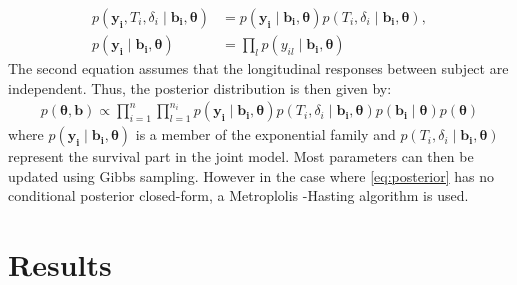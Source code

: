 \documentclass[11pt,twoside]{article}
\numberwithin{Theorem}{section}
\numberwithin{Definition}{section}
\numberwithin{Lemma}{section}
\numberwithin{Algorithm}{section}
\numberwithin{equation}{section}
\begin{document}
 \begin{align}
     p(\boldsymbol{y_i},T_i,\delta_i \mid \boldsymbol{b_i},\boldsymbol{\theta})&=p(\boldsymbol{y_i}\mid\boldsymbol{b_i},\boldsymbol{\theta})p(T_i,\delta_i\mid\boldsymbol{b_i},\boldsymbol{\theta}),
     \\
     p(\boldsymbol{y_i}\mid\boldsymbol{b_i},\boldsymbol{\theta})&=\prod_l p(y_{il} \mid \boldsymbol{b_i},\boldsymbol{\theta})
 \end{align}
 The second equation assumes that the longitudinal responses between subject are independent. Thus, the posterior distribution is then given by:
 \begin{align}
 \label{eq:posterior}
     p(\boldsymbol{\theta},\boldsymbol{b}) \propto \prod_{i=1}^{n} \prod_{l=1}^{n_i}p(\boldsymbol{y_i}\mid\boldsymbol{b_i},\boldsymbol{\theta})p(T_i,\delta_i\mid\boldsymbol{b_i},\boldsymbol{\theta})p(\boldsymbol{b_i}\mid \boldsymbol{\theta})p(\boldsymbol{\theta})
 \end{align}
 where $p(\boldsymbol{y_i}\mid\boldsymbol{b_i},\boldsymbol{\theta})$ is a member of the exponential family and $p(T_i,\delta_i\mid\boldsymbol{b_i},\boldsymbol{\theta})$ represent the survival part in the joint model. Most parameters can then be updated using Gibbs sampling. However in the case where \ref{eq:posterior} has no conditional posterior closed-form, a Metroplolis -Hasting algorithm is used.
%
%
\section{Results}
\label{sec:Models}
\end{document}
